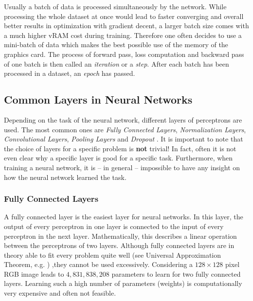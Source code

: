 Usually a batch of data is processed simultaneously by the network. While processing the whole dataset at once would lead to faster converging and overall better results in optimization with gradient decent, a larger batch size comes with a much higher vRAM cost during training. Therefore one often decides to use a mini-batch of data which makes the best possible use of the memory of the graphics card. The process of forward pass, loss computation and backward pass of one batch is then called an \textit{iteration} or a \textit{step}. After each batch has been processed in a dataset, an \textit{epoch} has passed.
%
\subsection{Common Layers in Neural Networks} \label{sec:2.1.3}
Depending on the task of the neural network, different layers of perceptrons are used. The most common ones are \textit{Fully Connected Layers}, \textit{Normalization Layers}, \textit{Convolutional Layers}, \textit{Pooling 
Layers} and \textit{Dropout }. It is important to note that the choice of layers for a specific problem is \textbf{not} trivial! In fact, often it is not even clear why a specific layer is good for a specific task. Furthermore, when training a neural network, it is – in general – impossible to have any insight on how the neural network learned the task.
%
\subsubsection{Fully Connected Layers}
A fully connected layer is the easiest layer for neural networks. In this layer, the output of every perceptron in one layer is connected to the input of every perceptron in the next layer. Mathematically, this describes a linear operation between the perceptrons of two layers. Although fully connected layers are in theory able to fit every problem quite well (see Universal Approximation Theorem, e.g. \cite{universal_appr_theorem}) ,they cannot be used excessively. Considering a $128\times128$ pixel RGB image leads to $4,831,838,208$ parameters to learn for two fully connected layers. Learning such a high number of parameters (weights) is computationally very expensive and often not feasible.
%
